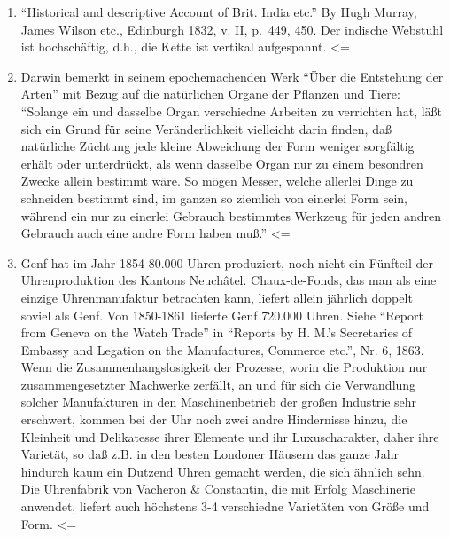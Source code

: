 {\begin{enumerate}
  Volksversammlungen \ldots{} In Ägypten dagegen verfällt jeder
  Handwerker in schwere Strafen, wenn er sich in Staatsgeschäfte mischt
  oder mehrere Künste zugleich treibt. So kann nichts ihren Berufsfleiß
  stören \ldots{} Zudem, wie sie von ihren Vorfahren viele Regeln haben,
  sind sie eifrig darauf bedacht, noch neue Vorteile aufzufinden.''
  (Diodorus Siculus: ``Historische Bibliothek'', I. I, c. 74.)
  \textless{}=
\item
  ``Historical and descriptive Account of Brit. India etc.'' By Hugh
  Murray, James Wilson etc., Edinburgh 1832, v. II, p.~449, 450. Der
  indische Webstuhl ist hochschäftig, d.h., die Kette ist vertikal
  aufgespannt. \textless{}=
\item
  Darwin bemerkt in seinem epochemachenden Werk ``Über die Entstehung
  der Arten'' mit Bezug auf die natürlichen Organe der Pflanzen und
  Tiere: ``Solange ein und dasselbe Organ verschiedne Arbeiten zu
  verrichten hat, läßt sich ein Grund für seine Veränderlichkeit
  vielleicht darin finden, daß natürliche Züchtung jede kleine
  Abweichung der Form weniger sorgfältig erhält oder unterdrückt, als
  wenn dasselbe Organ nur zu einem besondren Zwecke allein bestimmt
  wäre. So mögen Messer, welche allerlei Dinge zu schneiden bestimmt
  sind, im ganzen so ziemlich von einerlei Form sein, während ein nur zu
  einerlei Gebrauch bestimmtes Werkzeug für jeden andren Gebrauch auch
  eine andre Form haben muß.'' \textless{}=
\item
  Genf hat im Jahr 1854 80.000 Uhren produziert, noch nicht ein Fünfteil
  der Uhrenproduktion des Kantons Neuchâtel. Chaux-de-Fonds, das man als
  eine einzige Uhrenmanufaktur betrachten kann, liefert allein jährlich
  doppelt soviel als Genf. Von 1850-1861 lieferte Genf 720.000 Uhren.
  Siehe ``Report from Geneva on the Watch Trade'' in ``Reports by H.
  M.'s Secretaries of Embassy and Legation on the Manufactures, Commerce
  etc.'', Nr. 6, 1863. Wenn die Zusammenhangslosigkeit der Prozesse,
  worin die Produktion nur zusammengesetzter Machwerke zerfällt, an und
  für sich die Verwandlung solcher Manufakturen in den Maschinenbetrieb
  der großen Industrie sehr erschwert, kommen bei der Uhr noch zwei
  andre Hindernisse hinzu, die Kleinheit und Delikatesse ihrer Elemente
  und ihr Luxuscharakter, daher ihre Varietät, so daß z.B. in den besten
  Londoner Häusern das ganze Jahr hindurch kaum ein Dutzend Uhren
  gemacht werden, die sich ähnlich sehn. Die Uhrenfabrik von Vacheron \&
  Constantin, die mit Erfolg Maschinerie anwendet, liefert auch
  höchstens 3-4 verschiedne Varietäten von Größe und Form. \textless{}=

\end{enumerate}}
